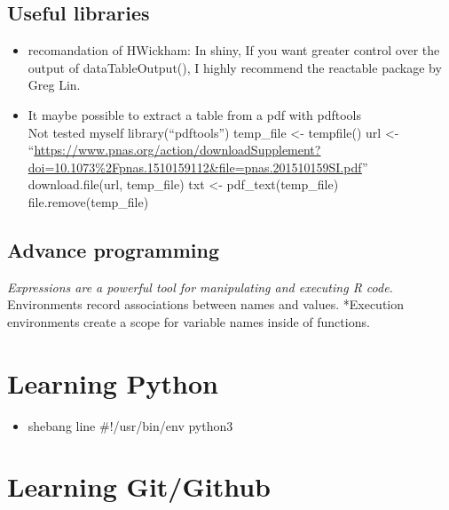 \documentclass[
]{book}
\providecommand{\tightlist}{%
  \setlength{\itemsep}{0pt}\setlength{\parskip}{0pt}}
\begin{document}
\hypertarget{useful-libraries}{%
\section{Useful libraries}\label{useful-libraries}}

\begin{itemize}
\item
  recomandation of HWickham:
  In shiny, If you want greater control over the output of dataTableOutput(), I highly recommend the reactable package by Greg Lin.
\item
  It maybe possible to extract a table from a pdf with pdftools\\
  Not tested myself
  library(``pdftools'')
  temp\_file \textless- tempfile()
  url \textless- ``\url{https://www.pnas.org/action/downloadSupplement?doi=10.1073\%2Fpnas.1510159112\&file=pnas.201510159SI.pdf}''
  download.file(url, temp\_file)
  txt \textless- pdf\_text(temp\_file)
  file.remove(temp\_file)
\end{itemize}

\hypertarget{advance-programming}{%
\section{Advance programming}\label{advance-programming}}

\emph{Expressions are a powerful tool for manipulating and executing R code.
}Environments record associations between names and values.
*Execution environments create a scope for variable names inside of functions.

\hypertarget{learning-python}{%
\chapter{Learning Python}\label{learning-python}}

\begin{itemize}
\tightlist
\item
  shebang line
  \#!/usr/bin/env python3
\end{itemize}

\hypertarget{learning-gitgithub}{%
\chapter{Learning Git/Github}\label{learning-gitgithub}}
\end{document}
